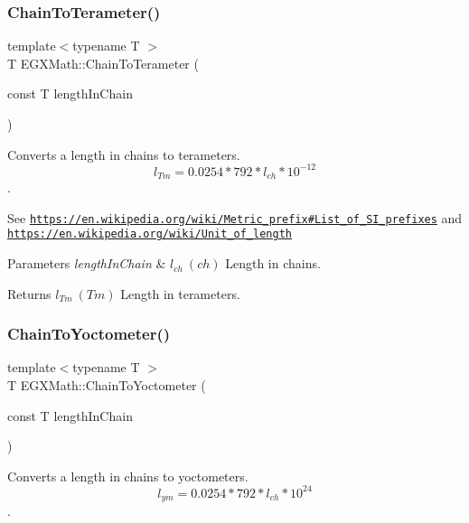 \subsubsection{\texorpdfstring{Chain\+To\+Terameter()}{ChainToTerameter()}}
{\footnotesize\ttfamily template$<$typename T $>$ \\
T E\+G\+X\+Math\+::\+Chain\+To\+Terameter (\begin{DoxyParamCaption}\item[{const T}]{length\+In\+Chain }\end{DoxyParamCaption})}



Converts a length in chains to terameters. \[ l_{Tm}=0.0254 * 792 * l_{ch} * 10^{-12} \]. 

See \href{https://en.wikipedia.org/wiki/Metric_prefix#List_of_SI_prefixes}{\tt https\+://en.\+wikipedia.\+org/wiki/\+Metric\+\_\+prefix\#\+List\+\_\+of\+\_\+\+S\+I\+\_\+prefixes} and \href{https://en.wikipedia.org/wiki/Unit_of_length}{\tt https\+://en.\+wikipedia.\+org/wiki/\+Unit\+\_\+of\+\_\+length} 
\begin{DoxyParams}{Parameters}
{\em length\+In\+Chain} & $ l_{ch}\ (ch)$ Length in chains. \\
\hline
\end{DoxyParams}
\begin{DoxyReturn}{Returns}
$ l_{Tm}\ (Tm)$ Length in terameters. 
\end{DoxyReturn}
\mbox{\label{group___e_g_x_math-_conversions-_length_conversions-_surveyors-_chain-_s_i_gafcc220586dd2018bb921f109efa11d06}} 
\subsubsection{\texorpdfstring{Chain\+To\+Yoctometer()}{ChainToYoctometer()}}
{\footnotesize\ttfamily template$<$typename T $>$ \\
T E\+G\+X\+Math\+::\+Chain\+To\+Yoctometer (\begin{DoxyParamCaption}\item[{const T}]{length\+In\+Chain }\end{DoxyParamCaption})}



Converts a length in chains to yoctometers. \[ l_{ym}=0.0254 * 792 * l_{ch} * 10^{24} \]. 

